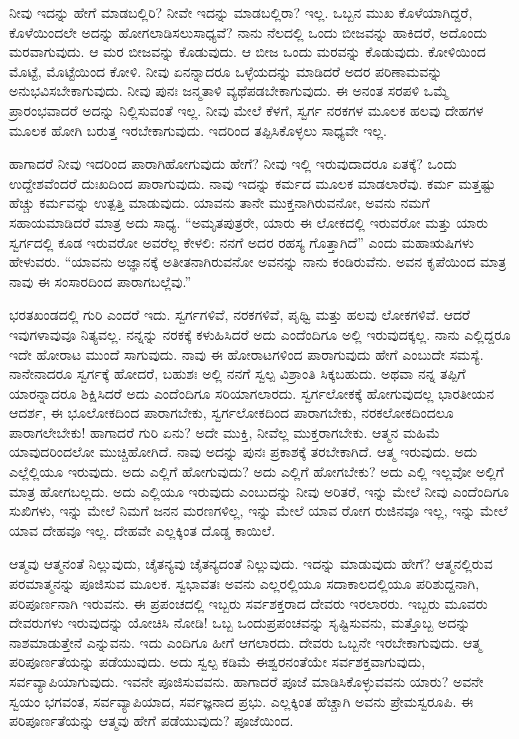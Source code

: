 ನೀವು ಇದನ್ನು ಹೇಗೆ ಮಾಡಬಲ್ಲಿರಿ? ನೀವೇ ಇದನ್ನು ಮಾಡಬಲ್ಲಿರಾ? ಇಲ್ಲ. ಒಬ್ಬನ ಮುಖ ಕೊಳೆಯಾಗಿದ್ದರೆ, ಕೊಳೆಯಿಂದಲೇ ಅದನ್ನು ಹೋಗಲಾಡಿಸಲು\break ಸಾಧ್ಯವೆ? ನಾನು ನೆಲದಲ್ಲಿ ಒಂದು ಬೀಜವನ್ನು ಹಾಕಿದರೆ, ಅದೊಂದು ಮರವಾಗುವುದು. ಆ ಮರ ಬೀಜವನ್ನು ಕೊಡುವುದು. ಆ ಬೀಜ ಒಂದು ಮರವನ್ನು ಕೊಡುವುದು. ಕೋಳಿಯಿಂದ ಮೊಟ್ಟೆ, ಮೊಟ್ಟೆಯಿಂದ ಕೋಳಿ. ನೀವು ಏನನ್ನಾದರೂ ಒಳ್ಳೆಯದನ್ನು ಮಾಡಿದರೆ ಅದರ ಪರಿಣಾಮವನ್ನು ಅನುಭವಿಸಬೇಕಾಗುವುದು. ನೀವು ಪುನಃ ಜನ್ಮತಾಳಿ ವ್ಯಥೆಪಡಬೇಕಾಗುವುದು. ಈ ಅನಂತ ಸರಪಳಿ ಒಮ್ಮೆ ಪ್ರಾರಂಭವಾದರೆ ಅದನ್ನು ನಿಲ್ಲಿಸುವಂತೆ ಇಲ್ಲ. ನೀವು ಮೇಲೆ ಕೆಳಗೆ, ಸ್ವರ್ಗ ನರಕಗಳ ಮೂಲಕ ಹಲವು ದೇಹಗಳ ಮೂಲಕ ಹೋಗಿ ಬರುತ್ತ ಇರಬೇಕಾಗುವುದು. ಇದರಿಂದ ತಪ್ಪಿಸಿಕೊಳ್ಳಲು ಸಾಧ್ಯವೇ ಇಲ್ಲ.

ಹಾಗಾದರೆ ನೀವು ಇದರಿಂದ ಪಾರಾಗಿಹೋಗುವುದು ಹೇಗೆ? ನೀವು ಇಲ್ಲಿ ಇರುವುದಾದರೂ ಏತಕ್ಕೆ? ಒಂದು ಉದ್ದೇಶವೆಂದರೆ ದುಃಖದಿಂದ ಪಾರಾಗುವುದು. ನಾವು ಇದನ್ನು ಕರ್ಮದ ಮೂಲಕ ಮಾಡಲಾರೆವು. ಕರ್ಮ ಮತ್ತಷ್ಟು ಹೆಚ್ಚು ಕರ್ಮವನ್ನು ಉತ್ಪತ್ತಿ ಮಾಡುವುದು. ಯಾವನು ತಾನೇ ಮುಕ್ತನಾಗಿರುವನೋ, ಅವನು ನಮಗೆ ಸಹಾಯಮಾಡಿದರೆ ಮಾತ್ರ ಅದು ಸಾಧ್ಯ. “ಅಮೃತಪುತ್ರರೇ, ಯಾರು ಈ ಲೋಕದಲ್ಲಿ ಇರುವರೋ ಮತ್ತು ಯಾರು ಸ್ವರ್ಗದಲ್ಲಿ ಕೂಡ ಇರುವರೋ ಅವರೆಲ್ಲ ಕೇಳಲಿ: ನನಗೆ ಅದರ ರಹಸ್ಯ ಗೊತ್ತಾಗಿದೆ'' ಎಂದು ಮಹಾಋಷಿಗಳು ಹೇಳುವರು. “ಯಾವನು ಅಜ್ಞಾನಕ್ಕೆ ಅತೀತನಾಗಿರುವನೋ ಅವನನ್ನು ನಾನು ಕಂಡಿರುವೆನು. ಅವನ ಕೃಪೆಯಿಂದ ಮಾತ್ರ ನಾವು ಈ ಸಂಸಾರದಿಂದ ಪಾರಾಗಬಲ್ಲೆವು.”

ಭರತಖಂಡದಲ್ಲಿ ಗುರಿ ಎಂದರೆ ಇದು. ಸ್ವರ್ಗಗಳಿವೆ, ನರಕಗಳಿವೆ, ಪೃಥ್ವಿ ಮತ್ತು ಹಲವು ಲೋಕಗಳಿವೆ. ಆದರೆ ಇವುಗಳಾವುವೂ ನಿತ್ಯವಲ್ಲ. ನನ್ನನ್ನು ನರಕಕ್ಕೆ ಕಳುಹಿಸಿದರೆ ಅದು ಎಂದೆಂದಿಗೂ ಅಲ್ಲಿ ಇರುವುದಕ್ಕಲ್ಲ. ನಾನು ಎಲ್ಲಿದ್ದರೂ ಇದೇ ಹೋರಾಟ ಮುಂದೆ ಸಾಗುವುದು. ನಾವು ಈ ಹೋರಾಟಗಳಿಂದ ಪಾರಾಗುವುದು ಹೇಗೆ ಎಂಬುದೇ ಸಮಸ್ಯೆ. ನಾನೇನಾದರೂ ಸ್ವರ್ಗಕ್ಕೆ ಹೋದರೆ, ಬಹುಶಃ ಅಲ್ಲಿ ನನಗೆ ಸ್ವಲ್ಪ ವಿಶ್ರಾಂತಿ ಸಿಕ್ಕಬಹುದು. ಅಥವಾ ನನ್ನ ತಪ್ಪಿಗೆ ಯಾರನ್ನಾದರೂ ಶಿಕ್ಷಿಸಿದರೆ ಅದು ಎಂದೆಂದಿಗೂ ಸರಿಯಾಗಲಾರದು. ಸ್ವರ್ಗಲೋಕಕ್ಕೆ ಹೋಗುವುದಲ್ಲ ಭಾರತೀಯನ ಆದರ್ಶ, ಈ ಭೂಲೋಕದಿಂದ ಪಾರಾಗಬೇಕು, ಸ್ವರ್ಗಲೋಕದಿಂದ ಪಾರಾಗಬೇಕು, ನರಕಲೋಕದಿಂದಲೂ ಪಾರಾಗಲೇಬೇಕು! ಹಾಗಾದರೆ ಗುರಿ ಏನು? ಅದೇ ಮುಕ್ತಿ, ನೀವೆಲ್ಲ ಮುಕ್ತರಾಗಬೇಕು. ಆತ್ಮನ ಮಹಿಮೆ ಯಾವುದರಿಂದಲೋ ಮುಚ್ಚಿಹೋಗಿದೆ. ನಾವು ಅದನ್ನು ಪುನಃ ಪ್ರಕಾಶಕ್ಕೆ ತರಬೇಕಾಗಿದೆ. ಆತ್ಮ ಇರುವುದು. ಅದು ಎಲ್ಲೆಲ್ಲಿಯೂ ಇರುವುದು. ಅದು ಎಲ್ಲಿಗೆ ಹೋಗುವುದು? ಅದು ಎಲ್ಲಿಗೆ ಹೋಗಬೇಕು? ಅದು ಎಲ್ಲಿ ಇಲ್ಲವೋ ಅಲ್ಲಿಗೆ ಮಾತ್ರ ಹೋಗಬಲ್ಲದು. ಅದು ಎಲ್ಲಿಯೂ ಇರುವುದು ಎಂಬುದನ್ನು ನೀವು ಅರಿತರೆ, ಇನ್ನು ಮೇಲೆ ನೀವು ಎಂದೆಂದಿಗೂ ಸುಖಿಗಳು, ಇನ್ನು ಮೇಲೆ ನಿಮಗೆ ಜನನ ಮರಣಗಳಿಲ್ಲ, ಇನ್ನು ಮೇಲೆ ಯಾವ ರೋಗ ರುಜಿನವೂ ಇಲ್ಲ, ಇನ್ನು ಮೇಲೆ ಯಾವ ದೇಹವೂ ಇಲ್ಲ. ದೇಹವೇ ಎಲ್ಲಕ್ಕಿಂತ ದೊಡ್ಡ ಕಾಯಿಲೆ.

ಆತ್ಮವು ಆತ್ಮನಂತೆ ನಿಲ್ಲುವುದು, ಚೈತನ್ಯವು ಚೈತನ್ಯದಂತೆ ನಿಲ್ಲುವುದು. ಇದನ್ನು ಮಾಡುವುದು ಹೇಗೆ? ಆತ್ಮನಲ್ಲಿರುವ ಪರಮಾತ್ಮನನ್ನು ಪೂಜಿಸುವ ಮೂಲಕ. ಸ್ವಭಾವತಃ ಅವನು ಎಲ್ಲರಲ್ಲಿಯೂ ಸದಾಕಾಲದಲ್ಲಿಯೂ ಪರಿಶುದ್ದನಾಗಿ, ಪರಿಪೂರ್ಣನಾಗಿ ಇರುವನು. ಈ ಪ್ರಪಂಚದಲ್ಲಿ ಇಬ್ಬರು ಸರ್ವಶಕ್ತರಾದ ದೇವರು ಇರಲಾರರು. ಇಬ್ಬರು ಮೂವರು ದೇವರುಗಳು ಇರುವುದನ್ನು ಯೋಚಿಸಿ ನೋಡಿ! ಒಬ್ಬ ಒಂದು\break ಪ್ರಪಂಚವನ್ನು ಸೃಷ್ಟಿಸುವನು, ಮತ್ತೊಬ್ಬ ಅದನ್ನು ನಾಶಮಾಡುತ್ತೇನೆ ಎನ್ನುವನು. ಇದು ಎಂದಿಗೂ ಹೀಗೆ ಆಗಲಾರದು. ದೇವರು ಒಬ್ಬನೇ ಇರಬೇಕಾಗುವುದು. ಆತ್ಮ ಪರಿಪೂರ್ಣತೆಯನ್ನು ಪಡೆಯುವುದು. ಅದು ಸ್ವಲ್ಪ ಕಡಿಮೆ ಈಶ್ವರನಂತೆಯೇ ಸರ್ವಶಕ್ತವಾಗುವುದು, ಸರ್ವವ್ಯಾಪಿಯಾಗುವುದು. ಇವನೇ ಪೂಜಿಸುವವನು. ಹಾಗಾದರೆ ಪೂಜೆ ಮಾಡಿಸಿಕೊಳ್ಳುವವನು ಯಾರು? ಅವನೇ ಸ್ವಯಂ ಭಗವಂತ, ಸರ್ವವ್ಯಾಪಿಯಾದ, ಸರ್ವಜ್ಞನಾದ ಪ್ರಭು. ಎಲ್ಲಕ್ಕಿಂತ ಹೆಚ್ಚಾಗಿ ಅವನು ಪ್ರೇಮಸ್ವರೂಪಿ. ಈ ಪರಿಪೂರ್ಣತೆಯನ್ನು ಆತ್ಮವು ಹೇಗೆ ಪಡೆಯುವುದು? ಪೂಜೆಯಿಂದ.

